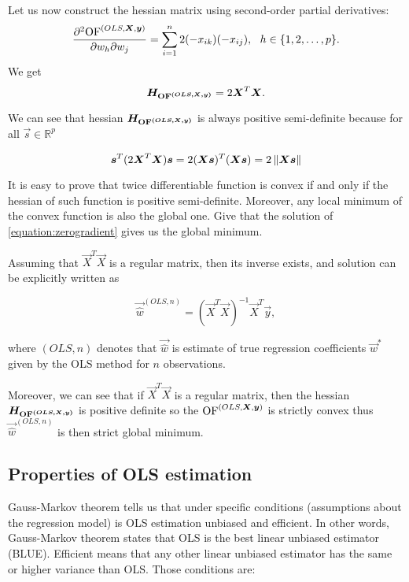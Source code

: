 Let us now construct the hessian matrix using second-order partial derivatives:
\begin{equation}
    \frac{\partial^2{\operatorname{OF}^{(OLS,\boldsymbol{X}, \boldsymbol{y})}} }{\partial w_h\partial w_j} = \sum\limits_{i=1}^n 2(- x_{ik})(-x_{ij}) \\, \ \ h \in \{{1,2,\ldots,p\}}. 
\end{equation}
We get 
\begin{equation}
    \boldsymbol{H_{\operatorname{OF}^{(OLS,\boldsymbol{X}, \boldsymbol{y})}}} = 2\boldsymbol{X}^T\boldsymbol{X}.
\end{equation}

We can see that hessian $\boldsymbol{H_{\operatorname{OF}^{(OLS,\boldsymbol{X}, \boldsymbol{y})}}}$ is always positive semi-definite because for all $\vec{s} \in \mathbb{R}^p$

\begin{equation}
    \boldsymbol{s}^T(2\boldsymbol{X}^T\boldsymbol{X})\boldsymbol{s} = 2(\boldsymbol{X}\boldsymbol{s})^T(\boldsymbol{X}\boldsymbol{s}) =  2 \left\lVert\boldsymbol{X}\boldsymbol{s}\right\rVert
\end{equation}

It is easy to prove that twice differentiable function is convex if and only if the hessian of such function is positive semi-definite. Moreover, any local minimum of the convex function is also the global one. Give that the solution of \eqref{equation:zerogradient} gives us the global minimum. 

Assuming that $\vec{X}^T\vec{X}$ is a regular matrix, then its inverse exists, and solution can be explicitly written as

\begin{equation} \label{wols}
    \vec{\hat{w}}^{(OLS,n)} = (\vec{X}^T\vec{X})^{-1}\vec{X}^T\vec{y}, 
\end{equation}

where $(OLS,n)$ denotes that $\vec{\hat{w}}$ is estimate of true regression coefficients $\vec{w}^*$  given by the OLS method for $n$ observations. 

Moreover, we can see that if $\vec{X}^T\vec{X}$ is a regular matrix, then the hessian $\boldsymbol{H_{\operatorname{OF}^{(OLS,\boldsymbol{X}, \boldsymbol{y})}}}$ is positive definite so the $\operatorname{OF}^{(OLS,\boldsymbol{X}, \boldsymbol{y})}$ is strictly convex thus $\vec{\hat{w}}^{(OLS,n)}$ is then strict global minimum.


\subsection{Properties of OLS estimation}
Gauss-Markov theorem tells us that under specific conditions (assumptions about the regression model) is OLS estimation unbiased and efficient. In other words, Gauss-Markov theorem states that OLS is the best linear unbiased estimator (BLUE). Efficient means that any other linear unbiased estimator has the same or higher variance than OLS.  Those conditions are:

